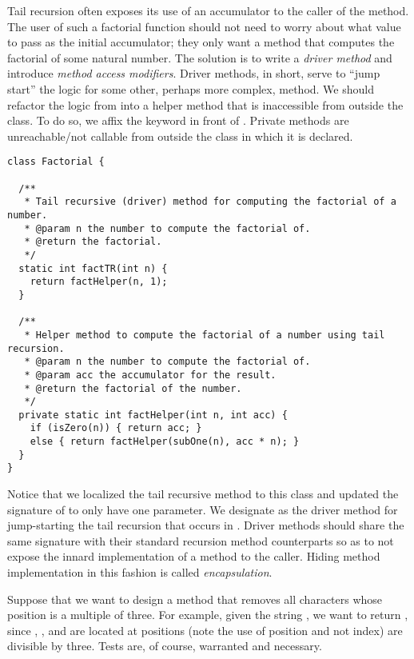 Tail recursion often exposes its use of an accumulator to the caller of the method. 
The user of such a factorial function should not need to worry about what value to pass as the initial accumulator; they only want a method that computes the factorial of some natural number. 
The solution is to write a \emph{driver method} and introduce \emph{method access modifiers}. 
Driver methods, in short, serve to ``jump start'' the logic for some other, perhaps more complex, method. 
We should refactor the logic from  into a helper method that is inaccessible from outside the class. 
To do so, we affix the  keyword in front of . 
Private methods are unreachable/not callable from outside the class in which it is declared.

\begin{lstlisting}[language=MyJava]
class Factorial {
  
  /**
   * Tail recursive (driver) method for computing the factorial of a number.
   * @param n the number to compute the factorial of.
   * @return the factorial.
   */
  static int factTR(int n) {
    return factHelper(n, 1);
  }

  /**
   * Helper method to compute the factorial of a number using tail recursion.
   * @param n the number to compute the factorial of.
   * @param acc the accumulator for the result.
   * @return the factorial of the number.
   */
  private static int factHelper(int n, int acc) {
    if (isZero(n)) { return acc; } 
    else { return factHelper(subOne(n), acc * n); }
  }
}
\end{lstlisting}

Notice that we localized the tail recursive method to this class and updated the signature of  to only have one parameter. 
We designate  as the driver method for jump-starting the tail recursion that occurs in . 
Driver methods should share the same signature with their standard recursion method counterparts so as to not expose the innard implementation of a method to the caller. 
Hiding method implementation in this fashion is called \emph{encapsulation}. 

Suppose that we want to design a method that removes all characters whose position is a multiple of three. 
For example, given the string , we want to return , since , , and  are located at positions (note the use of position and not index) are divisible by three. 
Tests are, of course, warranted and necessary.

